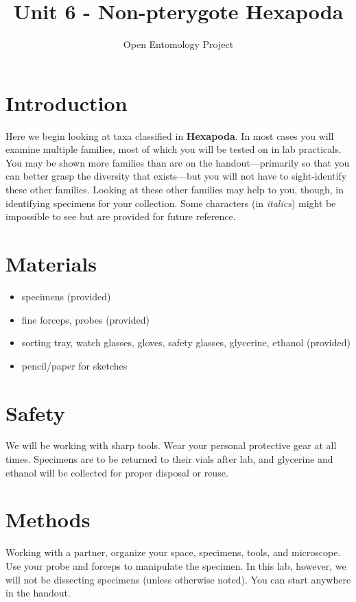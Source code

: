 \documentclass[letterpaper, 11pt]{article}
\title{Unit 6 - Non-pterygote Hexapoda}
\author{Open Entomology Project}
\begin{document}
\cleanlookdateon %
\maketitle
\thispagestyle{fancy}
\section*{Introduction}
Here we begin looking at taxa classified in \textbf{Hexapoda}. In most cases you will examine multiple families, most of which you will be tested on in lab practicals. You may be shown more families than are on the handout---primarily so that you can better grasp the diversity that exists---but you will not have to sight-identify these other families. Looking at these other families may help to you, though, in identifying specimens for your collection. Some characters (in \textit{italics}) might be impossible to see but are provided for future reference.

\section*{Materials}

\begin{itemize}
\item specimens (provided)
\item fine forceps, probes (provided)
\item sorting tray, watch glasses, gloves, safety glasses, glycerine, ethanol (provided)
\item pencil/paper for sketches
\end{itemize}

\section*{Safety}
We will be working with sharp tools. Wear your personal protective gear at all times. Specimens are to be returned to their vials after lab, and glycerine and ethanol will be collected for proper disposal or reuse.

\section*{Methods}
Working with a partner, organize your space, specimens, tools, and microscope. Use your probe and forceps to manipulate the specimen. In this lab, however, we will not be dissecting specimens (unless otherwise noted). You can start anywhere in the handout.
\end{document}
